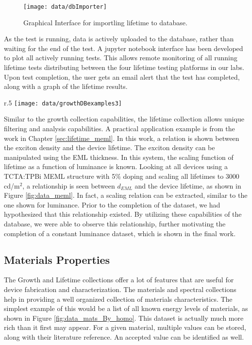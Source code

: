 \documentclass[../thesis.tex]{subfiles}
\begin{document}
\begin{figure}[ht]
\centering
\texttt{[image: data/dbImporter]}
\caption{Graphical Interface for importling lifetime to database.}
\label{fig:dbImporter}
\end{figure}

As the test is running, data is actively uploaded to the database, rather than waiting for the end of the test.
A jupyter notebook interface has been developed to plot all actively running tests.
This allows remote monitoring of all running lifetime tests distributing between the four lifetime testing platforms in our labs.
Upon test completion, the user gets an email alert that the test has completed, along with a graph of the lifetime results.


\begin{wrapfigure}{r}{.5\textwidth}
\centering
\texttt{[image: data/growthDBexamples3]}
\caption{Device lifetime for a particular set of devices as a function of EML thickness. All lifetimes scaled to 3000 cd/m$^2$, with scaled lifetimes shown in red.}
\label{fig:data_meml}
\end{wrapfigure}

Similar to the growth collection capabilities, the lifetime collection allows unique filtering and analysis capabilities.
A practical application example is from the work in Chapter \ref{sec:lifetime_meml}.
In this work, a relation is shown between the exciton density and the device lifetime.
The exciton density can be manipulated using the EML thickness.
In this system, the scaling function of lifetime as a function of luminance is known.  
Looking at all devices using a TCTA:TPBi MEML structure with 5\% doping and scaling all lifetimes to 3000 cd/m$^2$, a relationship is seen between $d_{EML}$ and the device lifetime, as shown in Figure \ref{fig:data_meml}.
In fact, a scaling relation can be extracted, similar to the one shown for luminance.
Prior to the completion of the dataset, we had hypothesized that this relationship existed.  
By utilizing these capabilities of the database, we were able to observe this relationship, further motivating the completion of a constant luminance dataset, which is shown in the final work.


\subsection{Materials Properties}

The Growth and Lifetime collections offer a lot of features that are useful for device fabrication and characterization.
The materials and spectral collections help in providing a well organized collection of materials characteristics.
The simplest example of this would be a list of all known energy levels of materials, as shown in Figure \ref{fig:data_mats_By_homo}.
This dataset is actually much more rich than it first may appear.  
For a given material, multiple values can be stored, along with their literature reference.
An accepted value can be identified as well.
\end{document}
